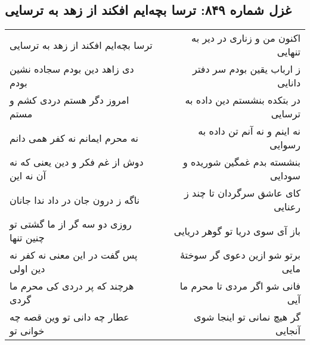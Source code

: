 \begin{center}
\section*{غزل شماره ۸۴۹: ترسا بچه‌ایم افکند از زهد به ترسایی}
\label{sec:849}
\begin{longtable}{l p{0.5cm} r}
ترسا بچه‌ایم افکند از زهد به ترسایی
&&
اکنون من و زناری در دیر به تنهایی
\\
دی زاهد دین بودم سجاده نشین بودم
&&
ز ارباب یقین بودم سر دفتر دانایی
\\
امروز دگر هستم دردی کشم و مستم
&&
در بتکده بنشستم دین داده به ترسایی
\\
نه محرم ایمانم نه کفر همی دانم
&&
نه اینم و نه آنم تن داده به رسوایی
\\
دوش از غم فکر و دین یعنی که نه آن نه این
&&
بنشسته بدم غمگین شوریده و سودایی
\\
ناگه ز درون جان در داد ندا جانان
&&
کای عاشق سرگردان تا چند ز رعنایی
\\
روزی دو سه گر از ما گشتی تو چنین تنها
&&
باز آی سوی دریا تو گوهر دریایی
\\
پس گفت در این معنی نه کفر نه دین اولی
&&
برتو شو ازین دعوی گر سوختهٔ مایی
\\
هرچند که پر دردی کی محرم ما گردی
&&
فانی شو اگر مردی تا محرم ما آیی
\\
عطار چه دانی تو وین قصه چه خوانی تو
&&
گر هیچ نمانی تو اینجا شوی آنجایی
\\
\end{longtable}
\end{center}
